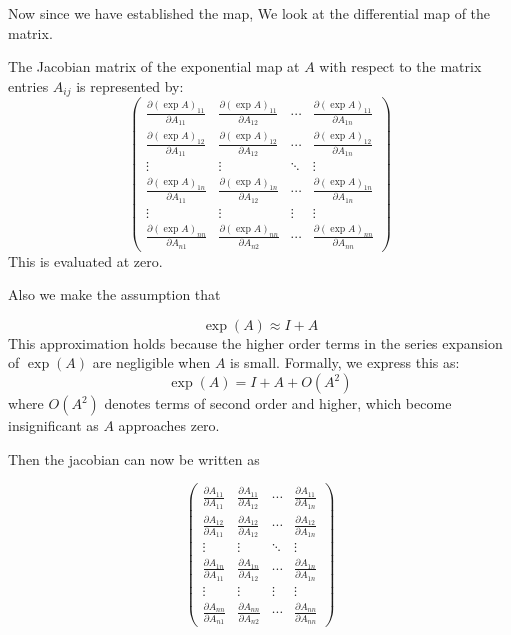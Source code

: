 \documentclass{article}
\begin{document}
Now since we have established the map, We look at the differential map of the matrix. 

The Jacobian matrix of the exponential map at \( A \) with respect to the matrix entries \( A_{ij} \) is represented by:
\[
\begin{pmatrix}
\frac{\partial (\exp A)_{11}}{\partial A_{11}} & \frac{\partial (\exp A)_{11}}{\partial A_{12}} & \cdots & \frac{\partial (\exp A)_{11}}{\partial A_{1n}} \\
\frac{\partial (\exp A)_{12}}{\partial A_{11}} & \frac{\partial (\exp A)_{12}}{\partial A_{12}} & \cdots & \frac{\partial (\exp A)_{12}}{\partial A_{1n}} \\
\vdots & \vdots & \ddots & \vdots \\
\frac{\partial (\exp A)_{1n}}{\partial A_{11}} & \frac{\partial (\exp A)_{1n}}{\partial A_{12}} & \cdots & \frac{\partial (\exp A)_{1n}}{\partial A_{1n}} \\
\vdots & \vdots & \vdots & \vdots \\
\frac{\partial (\exp A)_{nn}}{\partial A_{n1}} & \frac{\partial (\exp A)_{nn}}{\partial A_{n2}} & \cdots & \frac{\partial (\exp A)_{nn}}{\partial A_{nn}}
\end{pmatrix}
\]
This is evaluated at zero. 

Also we make the assumption that 

\[
\exp(A) \approx I + A
\]
This approximation holds because the higher order terms in the series expansion of \( \exp(A) \) are negligible when \( A \) is small. Formally, we express this as:
\[
\exp(A) = I + A + O(A^2)
\]
where \( O(A^2) \) denotes terms of second order and higher, which become insignificant as \( A \) approaches zero.

Then the jacobian can now be written as 

\[
\begin{pmatrix}
\frac{\partial A_{11}}{\partial A_{11}} & \frac{\partial A_{11}}{\partial A_{12}} & \cdots & \frac{\partial A_{11}}{\partial A_{1n}} \\
\frac{\partial A_{12}}{\partial A_{11}} & \frac{\partial A_{12}}{\partial A_{12}} & \cdots & \frac{\partial A_{12}}{\partial A_{1n}} \\
\vdots & \vdots & \ddots & \vdots \\
\frac{\partial A_{1n}}{\partial A_{11}} & \frac{\partial A_{1n}}{\partial A_{12}} & \cdots & \frac{\partial A_{1n}}{\partial A_{1n}} \\
\vdots & \vdots & \vdots & \vdots \\
\frac{\partial A_{nn}}{\partial A_{n1}} & \frac{\partial A_{nn}}{\partial A_{n2}} & \cdots & \frac{\partial A_{nn}}{\partial A_{nn}}
\end{pmatrix}
\]
\end{document}
